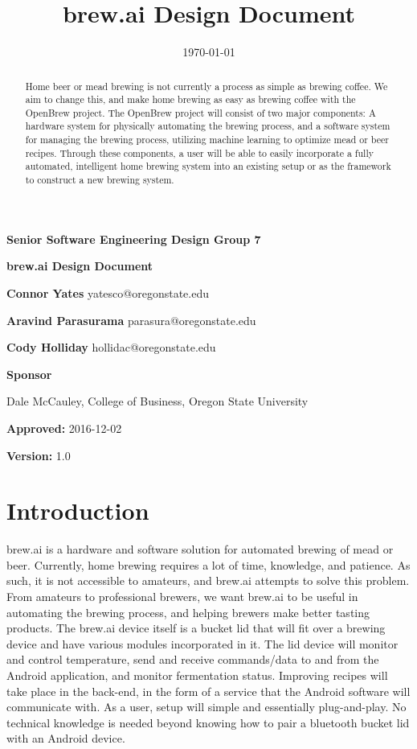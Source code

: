 \documentclass[draftclsnofoot,onecolumn,letterpaper,10pt]{IEEEtran}
\date{\today}
\title{brew.ai Design Document}
\begin{document}
{\huge\textbf{Senior Software Engineering Design Group 7}}
	\vspace{1cm}

{\Huge\textbf{brew.ai Design Document}}

\vspace{2cm}
\textbf{Connor Yates} yatesco@oregonstate.edu

\textbf{Aravind Parasurama} parasura@oregonstate.edu

\textbf{Cody Holliday} hollidac@oregonstate.edu

\vspace{2cm}
\textbf{Sponsor}

Dale McCauley, College of Business, Oregon State University

\vspace{0.5cm}
	\textbf{Approved:} 2016-12-02

	\textbf{Version:} 1.0


\newpage
\begin{abstract}
	Home beer or mead brewing is not currently a process as simple as brewing coffee.
	We aim to change this, and make home brewing as easy as brewing coffee with the OpenBrew project.
	The OpenBrew project will consist of two major components:
	A hardware system for physically automating the brewing process, and a software system for managing the brewing process, utilizing machine learning 
		to optimize mead or beer recipes.
	Through these components, a user will be able to easily incorporate a fully automated, intelligent home brewing system into an existing setup or 
		as the framework to construct a new brewing system.
\end{abstract}
\newpage
\tableofcontents
\newpage
\section{Introduction}
brew.ai is a hardware and software solution for automated brewing of mead or beer. Currently, home brewing requires a lot of time, knowledge, and 
	patience. 
As such, it is not accessible to amateurs, and brew.ai attempts to solve this problem. 
From amateurs to professional brewers, we want brew.ai to be useful in automating the brewing process, and helping brewers make better tasting products. 
The brew.ai device itself is a bucket lid that will fit over a brewing device and have various modules incorporated in it. 
The lid device will monitor and control temperature, send and receive commands/data to and from the Android application, and monitor fermentation status.
Improving recipes will take place in the back-end, in the form of a service that the Android software will communicate with. 
As a user, setup will simple and essentially plug-and-play. 
No technical knowledge is needed beyond knowing how to pair a bluetooth bucket lid with an Android device.
\end{document}
